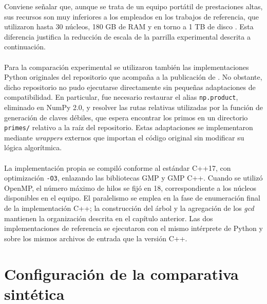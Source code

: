 Conviene señalar que, aunque se trata de un equipo portátil de prestaciones altas, sus recursos son muy inferiores a los empleados en los trabajos de referencia, que utilizaron hasta 30 núcleos, 180 GB de RAM y en torno a 1 TB de disco \citep{vage2022finding}. Esta diferencia justifica la reducción de escala de la parrilla experimental descrita a continuación.
\\
\\
Para la comparación experimental se utilizaron también las implementaciones Python originales del repositorio que acompaña a la publicación de \cite{pelofske2024efficient}. No obstante, dicho repositorio no pudo ejecutarse directamente sin pequeñas adaptaciones de compatibilidad. En particular, fue necesario restaurar el alias \texttt{np.product}, eliminado en NumPy 2.0, y resolver las rutas relativas utilizadas por la función de generación de claves débiles, que espera encontrar los primos en un directorio \texttt{primes/} relativo a la raíz del repositorio. Estas adaptaciones se implementaron mediante \textit{wrappers} externos que importan el código original sin modificar su lógica algorítmica.
\\
\\
La implementación propia se compiló conforme al estándar C++17, con
optimización \texttt{-O3}, enlazando las bibliotecas GMP y GMP C++. Cuando se
utilizó OpenMP, el número máximo de hilos se fijó en 18, correspondiente a los
núcleos disponibles en el equipo. El paralelismo se emplea en la fase de
enumeración final de la implementación C++; la construcción del árbol y la
agregación de los \textit{gcd} mantienen la organización descrita en el
capítulo anterior. Las dos implementaciones de referencia se ejecutaron con el
mismo intérprete de Python y sobre los mismos archivos de entrada que la
versión C++.

\section{Configuración de la comparativa sintética}

